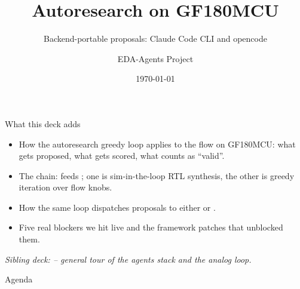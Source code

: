 \documentclass[aspectratio=169,11pt]{beamer}
\title{Autoresearch on GF180MCU}
\subtitle{Backend-portable proposals: Claude Code CLI and opencode}
\author{EDA-Agents Project}
\institute{Open-Source IC Design}
\date{\today}
\begin{document}
\begin{frame}[plain]
  \titlepage
\end{frame}

\begin{frame}{What this deck adds}
  \begin{itemize}
    \item How the autoresearch greedy loop applies to the
           flow on GF180MCU: what gets proposed, what
          gets scored, what counts as ``valid''.
    \item The  chain:  feeds
          ; one is sim-in-the-loop RTL synthesis,
          the other is greedy iteration over flow knobs.
    \item How the same loop dispatches proposals to either
           or .
    \item Five real blockers we hit live and the framework patches
          that unblocked them.
  \end{itemize}
  \vspace{0.4em}
  \textit{Sibling deck:  -- general
  tour of the agents stack and the analog loop.}
\end{frame}

\begin{frame}{Agenda}
  \tableofcontents
\end{frame}








\ifchipathon
  
\fi
\end{document}
